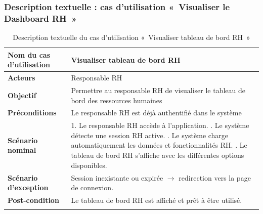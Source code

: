 \subsubsection*{Description textuelle : cas d'utilisation «~Visualiser le Dashboard RH~»}

\begin{center} \begin{longtable}{|p{5cm}|p{9cm}|} \hline \textbf{Nom du cas d'utilisation} & Visualiser tableau de bord RH \\ \hline \textbf{Acteurs} & Responsable RH \\ \hline \textbf{Objectif} & Permettre au responsable RH de visualiser le tableau de bord des ressources humaines \\ \hline \textbf{Préconditions} & Le responsable RH est déjà authentifié dans le système \\ \hline \textbf{Scénario nominal} & 1. Le responsable RH accède à l’application. \newline 2. Le système détecte une session RH active. \newline 3. Le système charge automatiquement les données et fonctionnalités RH. \newline 4. Le tableau de bord RH s’affiche avec les différentes options disponibles. \\ \hline \textbf{Scénario d'exception} & Session inexistante ou expirée $\rightarrow$ redirection vers la page de connexion. \\ \hline \textbf{Post-condition} & Le tableau de bord RH est affiché et prêt à être utilisé. \\ \hline \caption{Description textuelle du cas d'utilisation «~Visualiser tableau de bord RH~»} \end{longtable} \end{center}

